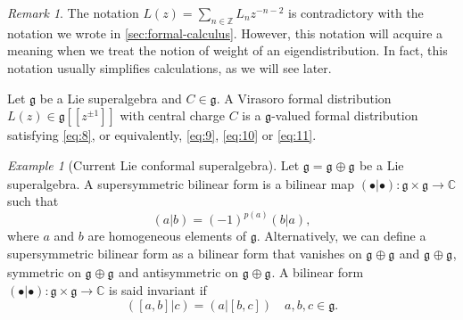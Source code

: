 \documentclass[a4paper, 12pt, reqno]{amsart}
\theoremstyle{remark}
\newtheorem{remark}[theorem]{Remark}
\newtheorem{example}[theorem]{Example}
\numberwithin{equation}{subsection}
\DeclareMathOperator{\zero}{\overline{0}}
\DeclareMathOperator{\one}{\overline{1}}
\begin{document}
\begin{remark}
  \label{rmk:6}
  The notation $L(z) = \sum_{n \in \mathbb{Z}}L_nz^{-n - 2}$ is contradictory with the notation we wrote in \cref{sec:formal-calculus}.
  However, this notation will acquire a meaning when we treat the notion of weight of an eigendistribution.
  In fact, this notation usually simplifies calculations, as we will see later.
\end{remark}

Let $\mathfrak{g}$ be a Lie superalgebra and $C \in \mathfrak{g}$.
A Virasoro formal distribution $L(z) \in \mathfrak{g}[[z^{\pm 1}]]$ with central charge $C$ is a $\mathfrak{g}$-valued formal distribution satisfying \eqref{eq:8}, or equivalently, \eqref{eq:9}, \eqref{eq:10} or \eqref{eq:11}.

\begin{example}[Current Lie conformal superalgebra]
  \label{exa:2}
  Let $\mathfrak{g} = \mathfrak{g}_{\zero} \oplus \mathfrak{g}_{\one}$ be a Lie superalgebra.
  A supersymmetric bilinear form is a bilinear map $(\bullet| \bullet): \mathfrak{g} \times \mathfrak{g} \to \mathbb{C}$ such that
  \begin{equation*}
    (a| b) = (-1)^{p(a)}(b| a),
  \end{equation*}
  where $a$ and $b$ are homogeneous elements of $\mathfrak{g}$.
  Alternatively, we can define a supersymmetric bilinear form as a bilinear form that vanishes on $\mathfrak{g}_{\zero} \oplus \mathfrak{g}_{\one}$ and $\mathfrak{g}_{\one} \oplus \mathfrak{g}_{\zero}$, symmetric on $\mathfrak{g}_{\zero} \oplus \mathfrak{g}_{\zero}$ and antisymmetric on $\mathfrak{g}_{\one} \oplus \mathfrak{g}_{\one}$.
  A bilinear form $(\bullet| \bullet): \mathfrak{g} \times \mathfrak{g} \to \mathbb{C}$ is said invariant if
  \begin{equation*}
    ([a, b]| c)=(a| [b, c])\quad a, b, c \in \mathfrak{g}.
  \end{equation*}


\end{example}
\end{document}
